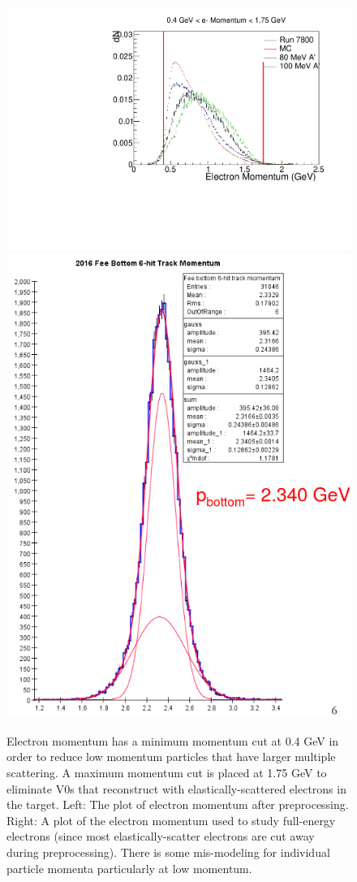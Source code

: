 \begin{figure}[t]
    \centering
    \includegraphics[width=.45\textwidth]{figs/recon/pre_eleP.pdf}
    \includegraphics[width=.35\textwidth]{figs/recon/feep.png}
    \caption{Electron momentum has a minimum momentum cut at 0.4 GeV in order to reduce low momentum particles that have larger multiple scattering. A maximum momentum cut is placed at 1.75 GeV to eliminate V0s that reconstruct with elastically-scattered electrons in the target. Left: The plot of electron momentum after preprocessing. Right: A plot of the electron momentum used to study full-energy electrons (since most elastically-scatter electrons are cut away during preprocessing). There is some mis-modeling for individual particle momenta particularly at low momentum.}
    \label{fig:pre_eleP_posP}
\end{figure}

